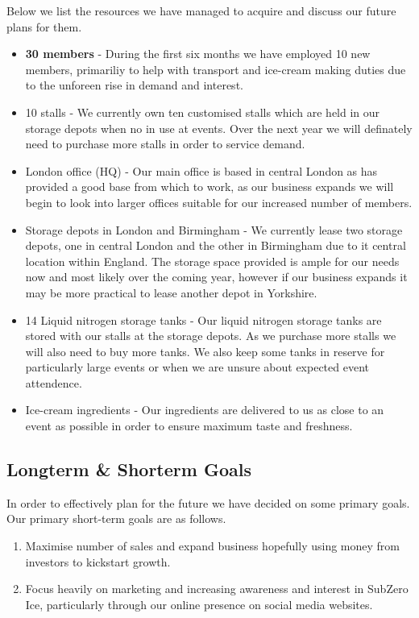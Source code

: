 \documentclass{article}
\begin{document}
  Below we list the resources we have managed to acquire and discuss our future plans for them.
  \begin{itemize}

  \item {\bf 30 members} - During the first six months we have employed 10 new members, primariliy to help with transport and ice-cream making duties due to the unforeen rise in demand and interest.

  \item 10 stalls - We currently own ten customised stalls which are held in our storage depots when no in use at events. Over the next year we will definately need to purchase more stalls in order to service demand.

  \item London office (HQ) - Our main office is based in central London as has provided a good base from which to work, as our business expands we will begin to look into larger offices suitable for our increased number of members.

  \item Storage depots in London and Birmingham - We currently lease two storage depots, one in central London and the other in Birmingham due to it central location within England. The storage space provided is ample for our needs now and most likely over the coming year, however if our business expands it may be more practical to lease another depot in Yorkshire.

  \item 14 Liquid nitrogen storage tanks - Our liquid nitrogen storage tanks are stored with our stalls at the storage depots. As we purchase more stalls we will also need to buy more tanks. We also keep some tanks in reserve for particularly large events or when we are unsure about expected event attendence.

  \item Ice-cream ingredients - Our ingredients are delivered to us as close to an event as possible in order to ensure maximum taste and freshness.

  \end{itemize}


  \subsection{Longterm \& Shorterm Goals}

  In order to effectively plan for the future we have decided on some primary goals. Our primary short-term goals are as follows.
  \begin{enumerate}

    \item Maximise number of sales and expand business hopefully using money from investors to kickstart growth.

    \item Focus heavily on marketing and increasing awareness and interest in SubZero Ice, particularly through our online presence on social media websites.
  \end{enumerate}
\end{document}
